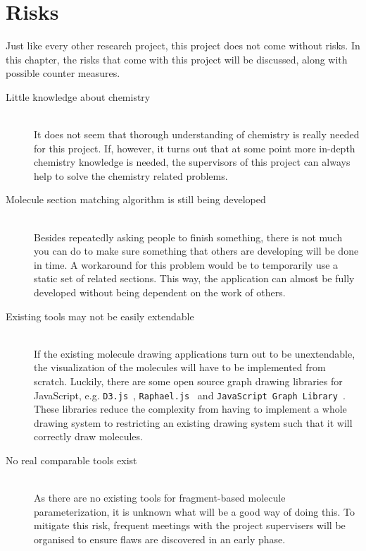 \chapter{Risks}

Just like every other research project, this project does not come without risks. In this chapter, the risks that come with this project will be discussed, along with possible counter measures.

\begin{description}
\item[Little knowledge about chemistry]~~\\
It does not seem that thorough understanding of chemistry is really needed for this project. If, however, it turns out that at some point more in-depth chemistry knowledge is needed, the supervisors of this project can always help to solve the chemistry related problems.

\item[Molecule section matching algorithm is still being developed]~~\\
Besides repeatedly asking people to finish something, there is not much you can do to make sure something that others are developing will be done in time. A workaround for this problem would be to temporarily use a static set of related sections. This way, the application can almost be fully developed without being dependent on the work of others.

\item[Existing tools may not be easily extendable]~~\\
If the existing molecule drawing applications turn out to be unextendable, the visualization of the molecules will have to be implemented from scratch. Luckily, there are some open source graph drawing libraries for JavaScript, e.g. \verb|D3.js|~\cite{x}, \verb|Raphael.js|~\cite{x} and \verb|JavaScript Graph Library|~\cite{x}. These libraries reduce the complexity from having to implement a whole drawing system to restricting an existing drawing system such that it will correctly draw molecules. 

\item[No real comparable tools exist]~~\\
As there are no existing tools for fragment-based molecule parameterization, it is unknown what will be a good way of doing this. To mitigate this risk, frequent meetings with the project supervisers will be organised to ensure flaws are discovered in an early phase.
\end{description}
